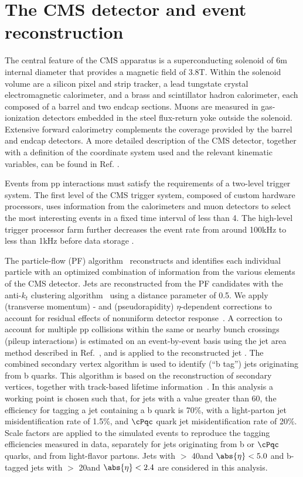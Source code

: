 \section{The CMS detector and event reconstruction}
\label{sect:CMSRec} 
The central feature of the CMS apparatus is a superconducting solenoid of 6\unit{m} internal diameter that provides a magnetic field of 3.8\unit{T}. Within the solenoid volume are a silicon pixel and strip tracker, a lead tungstate crystal electromagnetic calorimeter, and a brass and scintillator hadron calorimeter, each composed of a barrel and two endcap sections. Muons are measured in gas-ionization detectors embedded in the steel flux-return yoke outside the solenoid. Extensive forward calorimetry complements the coverage provided by the barrel and endcap detectors. 
A more detailed description of the CMS detector, together with a definition of the coordinate system used and the relevant kinematic variables, can be found in Ref. \cite{Chatrchyan:2008zzk}.

Events from pp interactions must satisfy the requirements of a two-level trigger system.
The first level of the CMS trigger system, composed of custom hardware processors, uses information from the calorimeters and muon detectors to select the most interesting events in a fixed time interval of less than 4\mus. The high-level trigger processor farm further decreases the event rate from around 100\unit{kHz} to less than 1\unit{kHz} before data storage \cite{Chatrchyan:2008zzk}. 

The particle-flow (PF) algorithm~\cite{CMS-PAS-PFT-09-001,CMS-PAS-PFT-10-001} reconstructs and identifies each individual particle with an optimized combination of information from the various elements of the CMS detector. 
Jets are reconstructed from the PF candidates with the anti-$k_t$ clustering
algorithm~\cite{Cacciari:2008gp} using a distance parameter of 0.5. We apply
 (transverse momentum) \pt- and (pseudorapidity) $\eta$-dependent corrections to account for residual
effects of nonuniform detector response~\cite{Chatrchyan:2011ds}.
A correction to account for multiple pp collisions within the same or nearby
bunch crossings (pileup interactions) is estimated on an event-by-event basis using the
jet area method described in Ref.~\cite{Cacciari:2007fd}, and is
applied to the reconstructed jet \pt.
The combined secondary vertex algorithm is used to identify (``b tag'') jets 
originating from b quarks.  This algorithm 
 is based on the reconstruction of secondary vertices, together with track-based lifetime information~\cite{Chatrchyan:2012jua}. 
In this analysis a working point is chosen such that, for jets with a \PT value greater than 60\GeV, the efficiency for tagging a jet containing a b quark is 70\%, with a light-parton jet misidentification rate of 1.5\%, and $\cPqc$ quark jet misidentification rate of 20\%.
Scale factors are applied to the simulated events to reproduce the tagging efficiencies measured in data, 
separately for jets originating from b or $\cPqc$ quarks, and from light-flavor partons.
Jets with  \PT $>$ 40\GeV and $\abs{\eta} < 5.0$ and b-tagged jets with \PT $>$ 20\GeV and $\abs{\eta} < 2.4$ are considered in this analysis.


